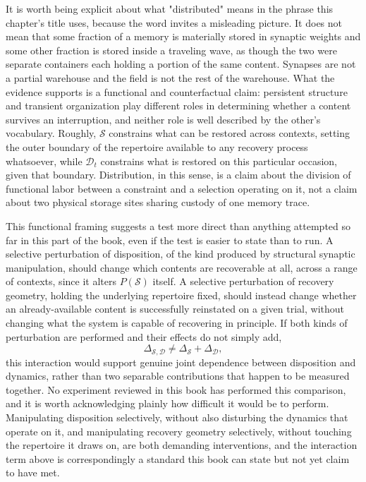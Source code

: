 \documentclass[11pt]{book}
\begin{document}
It is worth being explicit about what "distributed" means in the phrase this chapter's title uses, because the word invites a misleading picture. It does not mean that some fraction of a memory is materially stored in synaptic weights and some other fraction is stored inside a traveling wave, as though the two were separate containers each holding a portion of the same content. Synapses are not a partial warehouse and the field is not the rest of the warehouse. What the evidence supports is a functional and counterfactual claim: persistent structure and transient organization play different roles in determining whether a content survives an interruption, and neither role is well described by the other's vocabulary. Roughly, $\mathcal S$ constrains what can be restored across contexts, setting the outer boundary of the repertoire available to any recovery process whatsoever, while $\mathcal D_t$ constrains what is restored on this particular occasion, given that boundary. Distribution, in this sense, is a claim about the division of functional labor between a constraint and a selection operating on it, not a claim about two physical storage sites sharing custody of one memory trace.

This functional framing suggests a test more direct than anything attempted so far in this part of the book, even if the test is easier to state than to run. A selective perturbation of disposition, of the kind produced by structural synaptic manipulation, should change which contents are recoverable at all, across a range of contexts, since it alters $P(\mathcal S)$ itself. A selective perturbation of recovery geometry, holding the underlying repertoire fixed, should instead change whether an already-available content is successfully reinstated on a given trial, without changing what the system is capable of recovering in principle. If both kinds of perturbation are performed and their effects do not simply add,
\[
\Delta_{\mathcal S,\mathcal D}
\neq
\Delta_{\mathcal S}+\Delta_{\mathcal D},
\]
this interaction would support genuine joint dependence between disposition and dynamics, rather than two separable contributions that happen to be measured together. No experiment reviewed in this book has performed this comparison, and it is worth acknowledging plainly how difficult it would be to perform. Manipulating disposition selectively, without also disturbing the dynamics that operate on it, and manipulating recovery geometry selectively, without touching the repertoire it draws on, are both demanding interventions, and the interaction term above is correspondingly a standard this book can state but not yet claim to have met.
\end{document}
